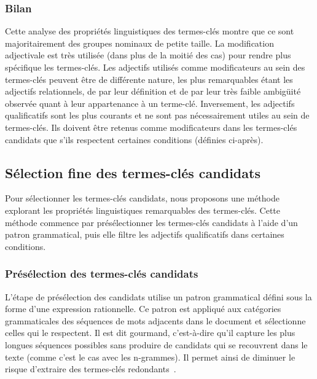       \subsubsection{Bilan}
      \label{subsubsec:main:domain_independent_keyphrase_extraction-keyphrase_candidate_selection-analysis_of_keyphrase_properties-conclusion}
        Cette analyse des propriétés linguistiques des termes-clés montre que ce
        sont majoritairement des groupes nominaux de petite taille.
        La modification adjectivale est très utilisée (dans plus de la moitié
        des cas) pour rendre plus spécifique les termes-clés. Les adjectifs
        utilisés comme modificateurs au sein des termes-clés peuvent être de
        différente nature, les plus remarquables étant les adjectifs
        relationnels, de par leur définition et de par leur très faible
        ambigüité observée quant à leur appartenance à un terme-clé.
        Inversement, les adjectifs qualificatifs sont les plus courants et ne
        sont pas nécessairement utiles au sein de termes-clés. Ils doivent être
        retenus comme modificateurs dans les termes-clés candidats que s'ils
        respectent certaines conditions (définies ci-après).

    \subsection{Sélection fine des termes-clés candidats}
    \label{subsec:main:domain_independent_keyphrase_extraction-keyphrase_candidate_selection-modifiers_filtering}
      Pour sélectionner les termes-clés candidats, nous proposons une méthode
      explorant les propriétés linguistiques remarquables des termes-clés. Cette
      méthode commence par présélectionner les termes-clés candidats à l'aide
      d'un patron grammatical, puis elle filtre les adjectifs qualificatifs dans
      certaines conditions.

      \subsubsection{Présélection des termes-clés candidats}
      \label{subsubsec:main:domain_independent_keyphrase_extraction-keyphrase_candidate_selection-modifiers_filtering-candidate_pre_selection}
        L'étape de présélection des candidats utilise un patron grammatical
        défini sous la forme d'une expression rationnelle. Ce patron est
        appliqué aux catégories grammaticales des séquences de mots adjacents
        dans le document et sélectionne celles qui le respectent. Il est dit
        \og{}gourmand\fg{}, c'est-à-dire qu'il capture les plus longues
        séquences possibles sans produire de candidats qui se recouvrent dans le
        texte (comme c'est le cas avec les n-grammes). Il permet ainsi de
        diminuer le risque d'extraire des termes-clés
        redondants~\cite{hasan2014state_of_the_art}.

